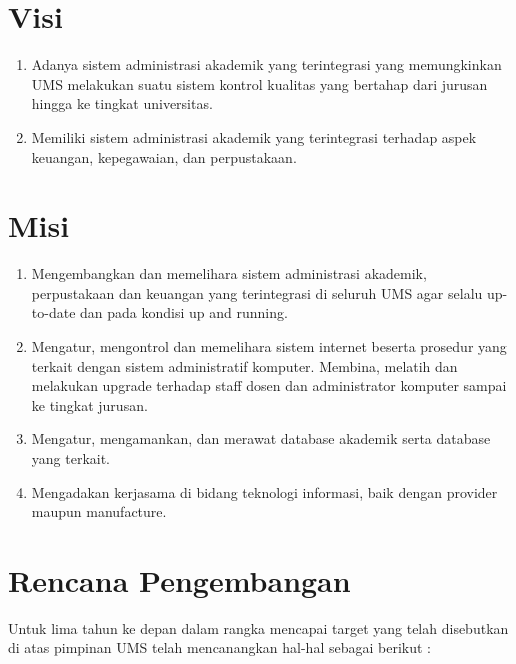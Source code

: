 \section{Visi}
\begin{enumerate}[itemsep=-1ex]
\item Adanya sistem administrasi akademik yang terintegrasi yang memungkinkan UMS melakukan suatu sistem kontrol kualitas yang bertahap dari jurusan hingga ke tingkat universitas.
\item Memiliki sistem administrasi akademik yang terintegrasi terhadap aspek keuangan, kepegawaian, dan perpustakaan.
\end{enumerate}

\section{Misi}
\begin{enumerate}[itemsep=-1ex]
\item Mengembangkan dan memelihara sistem administrasi akademik, perpustakaan dan keuangan yang terintegrasi di seluruh UMS agar selalu up-to-date dan pada kondisi up and running.
\item Mengatur, mengontrol dan memelihara sistem internet beserta prosedur yang terkait dengan sistem administratif komputer.
Membina, melatih dan melakukan upgrade terhadap staff dosen dan administrator komputer sampai ke tingkat jurusan.
\item Mengatur, mengamankan, dan merawat database akademik serta database yang terkait.
\item Mengadakan kerjasama di bidang teknologi informasi, baik dengan provider maupun manufacture.
\end{enumerate}

\section{Rencana Pengembangan}
Untuk lima tahun ke depan dalam rangka mencapai target yang telah disebutkan di atas pimpinan UMS  telah mencanangkan hal-hal sebagai berikut :

